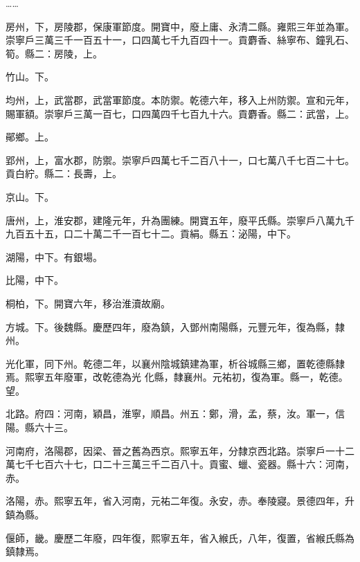 \begin{pinyinscope}
 ……



 房州，下，房陵郡，保康軍節度。開寶中，廢上庸、永清二縣。雍熙三年並為軍。崇寧戶三萬三千一百五十一，口四萬七千九百四十一。貢麝香、絲寧布、鐘乳石、筍。縣二：房陵，上。



 竹山。下。



 均州，上，武當郡，武當軍節度。本防禦。乾德六年，移入上州防禦。宣和元年，賜軍額。崇寧戶三萬一百七，口四萬四千七百九十六。貢麝香。縣二：武當，上。



 鄖鄉。上。



 郢州，上，富水郡，防禦。崇寧戶四萬七千二百八十一，口七萬八千七百二十七。貢白紵。縣二：長壽，上。



 京山。下。



 唐州，上，淮安郡，建隆元年，升為團練。開寶五年，廢平氏縣。崇寧戶八萬九千九百五十五，口二十萬二千一百七十二。貢絹。縣五：泌陽，中下。



 湖陽，中下。有銀場。



 比陽，中下。



 桐柏，下。開寶六年，移治淮瀆故廟。



 方城。下。後魏縣。慶歷四年，廢為鎮，入鄧州南陽縣，元豐元年，復為縣，隸州。



 光化軍，同下州。乾德二年，以襄州陰城鎮建為軍，析谷城縣三鄉，置乾德縣隸焉。熙寧五年廢軍，改乾德為光
 化縣，隸襄州。元祐初，復為軍。縣一，乾德。望。



 北路。府四：河南，穎昌，淮寧，順昌。州五：鄭，滑，孟，蔡，汝。軍一，信陽。縣六十三。



 河南府，洛陽郡，因梁、晉之舊為西京。熙寧五年，分隸京西北路。崇寧戶一十二萬七千七百六十七，口二十三萬三千二百八十。貢蜜、蠟、瓷器。縣十六：河南，赤。



 洛陽，赤。熙寧五年，省入河南，元祐二年復。永安，赤。奉陵寢。景德四年，升鎮為縣。



 偃師，畿。慶歷二年廢，四年復，熙寧五年，省入緱氏，八年，復置，省緱氏縣為鎮隸焉。




\end{pinyinscope}
